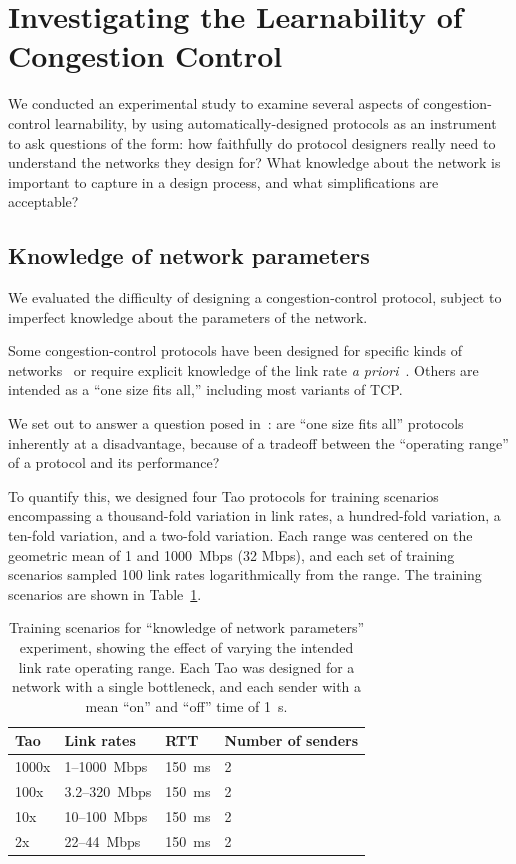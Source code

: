 \section{Investigating the Learnability of Congestion Control}
\label{s:operational}

We conducted an experimental study to examine several aspects of
congestion-control learnability, by using automatically-designed
protocols as an instrument to ask questions of the form: how
faithfully do protocol designers really need to understand the
networks they design for? What knowledge about the network is
important to capture in a design process, and what simplifications are
acceptable?

\subsection{Knowledge of network parameters}

\label{s:oprangeperftradeoff}

We evaluated the difficulty of designing a congestion-control
protocol, subject to imperfect knowledge about the parameters of the
network.

Some congestion-control protocols have been designed for specific
kinds of networks~\cite{dctcp,westwood} or require explicit knowledge
of the link rate \emph{a priori}~\cite{xcp}. Others are intended as a
``one size fits all,'' including most variants of TCP.

We set out to answer a question posed in~\cite{wroclawski}: are ``one
size fits all'' protocols inherently at a disadvantage, because of a
tradeoff between the ``operating range'' of a protocol and its performance?

To quantify this, we designed four Tao protocols for training
scenarios encompassing a thousand-fold variation in link rates, a
hundred-fold variation, a ten-fold variation, and a two-fold
variation. Each range was centered on the geometric mean of 1 and
1000~Mbps (32 Mbps), and each set of training scenarios sampled 100
link rates logarithmically from the range. The training scenarios are
shown in Table~\ref{table:oprange}.

\begin{table}
\begin{tabular}{l|l|l|l}
\bf Tao & \bf Link rates & \bf RTT & \bf Number of senders \\
\hline
1000x  & 1--1000~Mbps & 150~ms & 2 \\
100x   & 3.2--320~Mbps & 150~ms & 2 \\
10x    & 10--100~Mbps & 150~ms & 2 \\
2x     & 22--44~Mbps & 150~ms & 2 \\
\end{tabular}
\caption{Training scenarios for ``knowledge of network parameters''
  experiment, showing the effect of varying the intended link rate
  operating range. Each Tao was designed for a network with a single
  bottleneck, and each sender with a mean ``on'' and ``off'' time of
  1~s.}
\label{table:oprange}
\end{table}

